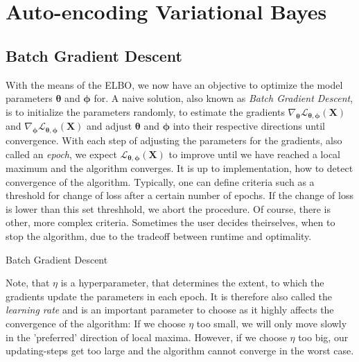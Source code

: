 \documentclass[12pt]{report}
\theoremstyle{definition}
\begin{document}
\section{Auto-encoding Variational Bayes}
\subsection{Batch Gradient Descent}
With the means of the ELBO, we now have an objective to optimize the model parameters $\pmb{\theta}$ and $\pmb{\phi}$ for. A naive solution, also known as \emph{Batch Gradient Descent}, is to initialize the parameters randomly, to estimate the gradients $\nabla_{\pmb{\theta}}\mathcal{L}_{\pmb{\theta}, \pmb{\phi}}(\mathbf{X})$ and $\nabla_{\pmb{\pmb{\phi}}}\mathcal{L}_{\pmb{\theta}, \pmb{\phi}}(\mathbf{X})$ and adjust $\pmb{\theta}$ and $\pmb{\phi}$ into their respective directions until convergence. With each step of adjusting the parameters for the gradients, also called an \emph{epoch}, we expect $\mathcal{L}_{\pmb{\theta}, \pmb{\phi}}(\mathbf{X})$ to improve until we have reached a local maximum and the algorithm converges. It is up to implementation, how to detect convergence of the algorithm. Typically, one can define criteria such as a threshold for change of loss after a certain number of epochs. If the change of loss is lower than this set threshhold, we abort the procedure. Of course, there is other, more complex criteria. Sometimes the user decides theirselves, when to stop the algorithm, due to the tradeoff between runtime and optimality.

\begin{algorithm}[H]
\SetAlgoLined
{}
\caption{Batch Gradient Descent}
\end{algorithm}
Note, that $\eta$ is a hyperparameter, that determines the extent, to which the gradients update the parameters in each epoch. It is therefore also called the \emph{learning rate} and is an important parameter to choose as it highly affects the convergence of the algorithm: If we choose $\eta$ too small, we will only move slowly in the 'preferred' direction of local maxima. However, if we choose $\eta$ too big, our updating-steps get too large and the algorithm cannot converge in the worst case.
\end{document}
